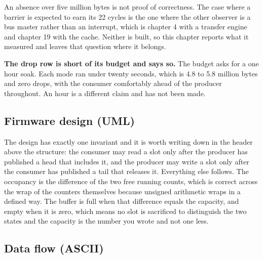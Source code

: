 An absence over five million bytes is not proof of correctness. The case where a
barrier is expected to earn its 22 cycles is the one where the other observer is a
bus master rather than an interrupt, which is chapter 4 with a transfer engine and
chapter 19 with the cache. Neither is built, so this chapter reports what it
measured and leaves that question where it belongs.

\textbf{The drop row is short of its budget and says so.} The budget asks for a one
hour soak. Each mode ran under twenty seconds, which is 4.8 to 5.8 million bytes
and zero drops, with the consumer comfortably ahead of the producer throughout. An hour is a
different claim and has not been made.

\subsection*{Firmware design (UML)}


The design has exactly one invariant and it is worth writing down in the header
above the structure: the consumer may read a slot only after the producer has
published a head that includes it, and the producer may write a slot only after
the consumer has published a tail that releases it. Everything else follows.
The occupancy is the difference of the two free running counts, which is correct
across the wrap of the counters themselves because unsigned arithmetic wraps in
a defined way. The buffer is full when that difference equals the capacity, and
empty when it is zero, which means no slot is sacrificed to distinguish the two
states and the capacity is the number you wrote and not one less.

\subsection*{Data flow (ASCII)}


